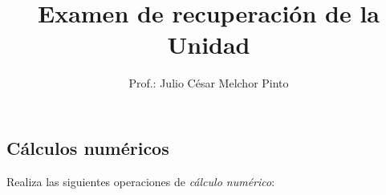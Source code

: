 \documentclass[12pt,addpoints]{evalua}
\title{Examen de {\color{brown}recuperación} de la Unidad}
\author{Prof.: Julio César Melchor Pinto}
\begin{document}
\begin{multicols}{2}
	\tableofcontents
\end{multicols}\newpage
\begin{questions}\large
	\section{Cálculos numéricos}

      \question[10] Realiza las siguientes operaciones de \textit{cálculo numérico}:
   
      \begin{parts}
\end{parts}
\end{questions}
\end{document}

